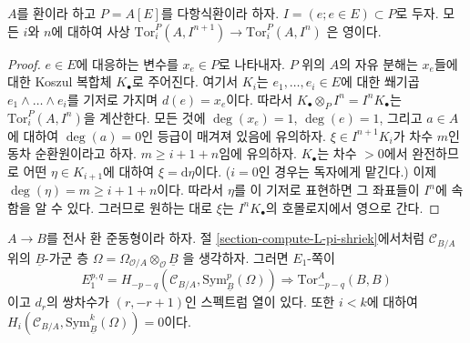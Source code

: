 \begin{lemma}
\label{lemma-map-tors-zero}
$A$를 환이라 하고 $P = A[E]$를 다항식환이라 하자.
$I = (e; e \in E) \subset P$로 두자. 모든 $i$와 $n$에 대하여 사상
$\text{Tor}_i^P(A, I^{n + 1}) \to \text{Tor}_i^P(A, I^n)$
은 영이다.
\end{lemma}

\begin{proof}
$e \in E$에 대응하는 변수를 $x_e \in P$로 나타내자. $P$ 위의 $A$의
자유 분해는 $x_e$들에 대한 Koszul 복합체 $K_\bullet$로 주어진다. 여기서
$K_i$는 $e_1, \ldots, e_i \in E$에 대한 쐐기곱
$e_1 \wedge \ldots \wedge e_i$를 기저로 가지며 $d(e) = x_e$이다. 따라서
$K_\bullet \otimes_P I^n = I^nK_\bullet$는
$\text{Tor}_i^P(A, I^n)$을 계산한다. 모든 것에
$\deg(x_e) = 1$, $\deg(e) = 1$, 그리고 $a \in A$에 대하여
$\deg(a) = 0$인 등급이 매겨져 있음에 유의하자. $\xi \in I^{n + 1}K_i$가
차수 $m$인 동차 순환원이라고 하자. $m \geq i + 1 + n$임에 유의하자.
$K_\bullet$는 차수 $ > 0$에서 완전하므로 어떤 $\eta \in K_{i + 1}$에
대하여 $\xi = \text{d}\eta$이다. ($i = 0$인 경우는 독자에게 맡긴다.)
이제 $\deg(\eta) = m \geq i + 1 + n$이다. 따라서 $\eta$를 이 기저로
표현하면 그 좌표들이 $I^n$에 속함을 알 수 있다. 그러므로 원하는 대로
$\xi$는 $I^nK_\bullet$의 호몰로지에서 영으로 간다.
\end{proof}

\begin{theorem}
\label{theorem-quillen-spectral-sequence}
$A \to B$를 전사 환 준동형이라 하자. 절
\ref{section-compute-L-pi-shriek}에서처럼 $\mathcal{C}_{B/A}$ 위의
$\underline{B}$-가군 층
$\Omega = \Omega_{\mathcal{O}/A} \otimes_\mathcal{O} \underline{B}$
을 생각하자. 그러면 $E_1$-쪽이
$$
E_1^{p, q} =
H_{- p - q}(\mathcal{C}_{B/A}, \text{Sym}^p_{\underline{B}}(\Omega))
\Rightarrow \text{Tor}^A_{- p - q}(B, B)
$$
이고 $d_r$의 쌍차수가 $(r, -r + 1)$인 스펙트럼 열이 있다. 또한
$i < k$에 대하여
$H_i(\mathcal{C}_{B/A}, \text{Sym}^k_{\underline{B}}(\Omega)) = 0$이다.
\end{theorem}


